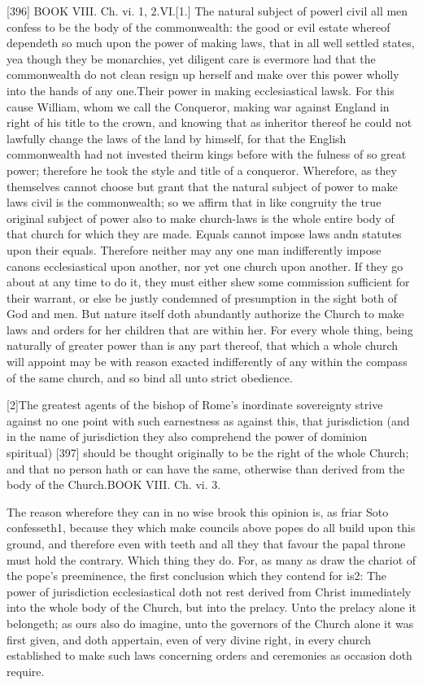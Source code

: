 [396]
BOOK VIII. Ch. vi. 1, 2.VI.[1.] The natural subject of powerl civil all men confess to be the body of the commonwealth: the good or evil estate whereof dependeth so much upon the power of making laws, that in all well settled states, yea though they be monarchies, yet diligent care is evermore had that the commonwealth do not clean resign up herself and make over this power wholly into the hands of any one.Their power in making ecclesiastical lawsk. For this cause William, whom we call the Conqueror, making war against England in right of his title to the crown, and knowing that as inheritor thereof he could not lawfully change the laws of the land by himself, for that the English commonwealth had not invested theirm kings before with the fulness of so great power; therefore he took the style and title of a conqueror. Wherefore, as they themselves cannot choose but grant that the natural subject of power to make laws civil is the commonwealth; so we affirm that in like congruity the true original subject of power also to make church-laws is the whole entire body of that church for which they are made. Equals cannot impose laws andn statutes upon their equals. Therefore neither may any one man indifferently impose canons ecclesiastical upon another, nor yet one church upon another. If they go about at any time to do it, they must either shew some commission sufficient for their warrant, or else be justly condemned of presumption in the sight both of God and men. But nature itself doth abundantly authorize the Church to make laws and orders for her children that are within her. For every whole thing, being naturally of greater power than is any part thereof, that which a whole church will appoint may be with reason exacted indifferently of any within the compass of the same church, and so bind all unto strict obedience.

[2]The greatest agents of the bishop of Rome’s inordinate sovereignty strive against no one point with such earnestness as against this, that jurisdiction (and in the name of jurisdiction they also comprehend the power of dominion spiritual) [397] should be thought originally to be the right of the whole Church; and that no person hath or can have the same, otherwise than derived from the body of the Church.BOOK VIII. Ch. vi. 3.

The reason wherefore they can in no wise brook this opinion is, as friar Soto confesseth1, because they which make councils above popes do all build upon this ground, and therefore even with teeth and all they that favour the papal throne must hold the contrary. Which thing they do. For, as many as draw the chariot of the pope’s preeminence, the first conclusion which they contend for is2: The power of jurisdiction ecclesiastical doth not rest derived from Christ immediately into the whole body of the Church, but into the prelacy. Unto the prelacy alone it belongeth; as ours also do imagine, unto the governors of the Church alone it was first given, and doth appertain, even of very divine right, in every church established to make such laws concerning orders and ceremonies as occasion doth require.

